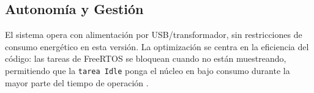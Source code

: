 \subsection{Autonomía y Gestión}
El sistema opera con alimentación por USB/transformador, sin restricciones de consumo energético en esta versión. La optimización se centra en la eficiencia del código: las tareas de FreeRTOS se bloquean cuando no están muestreando, permitiendo que la \texttt{tarea Idle} ponga el núcleo en bajo consumo durante la mayor parte del tiempo de operación \citep{mazidi2014}.

